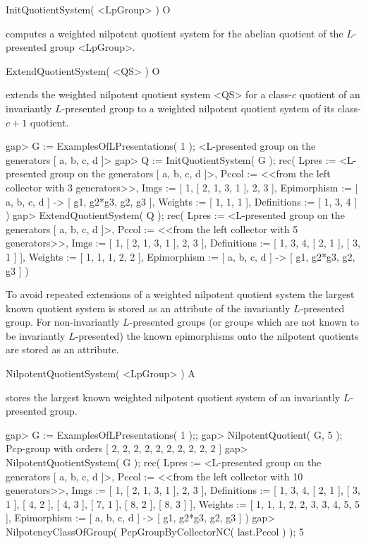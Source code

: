\> InitQuotientSystem( <LpGroup> ) O

computes a weighted nilpotent quotient system for the abelian quotient
of the $L$-presented group <LpGroup>.

\> ExtendQuotientSystem( <QS> ) O

extends the weighted nilpotent quotient system <QS> for a class-$c$
quotient of an invariantly $L$-presented group to a weighted nilpotent
quotient system of its class-$c+1$ quotient.

\beginexample
gap> G := ExamplesOfLPresentations( 1 );
<L-presented group on the generators [ a, b, c, d ]>
gap> Q := InitQuotientSystem( G );
rec( Lpres := <L-presented group on the generators [ a, b, c, d ]>, 
  Pccol := <<from the left collector with 3 generators>>, 
  Imgs := [ 1, [ 2, 1, 3, 1 ], 2, 3 ], Epimorphism := [ a, b, c, d ] -> 
    [ g1, g2*g3, g2, g3 ], Weights := [ 1, 1, 1 ], Definitions := [ 1, 3, 4 ] 
 )
gap> ExtendQuotientSystem( Q );
rec( Lpres := <L-presented group on the generators [ a, b, c, d ]>, 
  Pccol := <<from the left collector with 5 generators>>, 
  Imgs := [ 1, [ 2, 1, 3, 1 ], 2, 3 ], 
  Definitions := [ 1, 3, 4, [ 2, 1 ], [ 3, 1 ] ], 
  Weights := [ 1, 1, 1, 2, 2 ], Epimorphism := [ a, b, c, d ] -> 
    [ g1, g2*g3, g2, g3 ] )
\endexample


To avoid repeated extensions of a weighted nilpotent quotient system
the largest known quotient system is stored as an attribute of the
invariantly $L$-presented group. For non-invariantly $L$-presented groups
(or groups which are not known to be invariantly $L$-presented) the known
epimorphisms onto the nilpotent quotients are stored as an attribute.

\> NilpotentQuotientSystem( <LpGroup> ) A

stores the largest known weighted nilpotent quotient system of an
invariantly $L$-presented group.

\beginexample
gap> G := ExamplesOfLPresentations( 1 );;
gap> NilpotentQuotient( G, 5 );
Pcp-group with orders [ 2, 2, 2, 2, 2, 2, 2, 2, 2, 2 ]
gap> NilpotentQuotientSystem( G );
rec( Lpres := <L-presented group on the generators [ a, b, c, d ]>, 
  Pccol := <<from the left collector with 10 generators>>, 
  Imgs := [ 1, [ 2, 1, 3, 1 ], 2, 3 ], 
  Definitions := [ 1, 3, 4, [ 2, 1 ], [ 3, 1 ], [ 4, 2 ], [ 4, 3 ], [ 7, 1 ], 
      [ 8, 2 ], [ 8, 3 ] ], Weights := [ 1, 1, 1, 2, 2, 3, 3, 4, 5, 5 ], 
  Epimorphism := [ a, b, c, d ] -> [ g1, g2*g3, g2, g3 ] )
gap> NilpotencyClassOfGroup( PcpGroupByCollectorNC( last.Pccol ) );
5
\endexample

